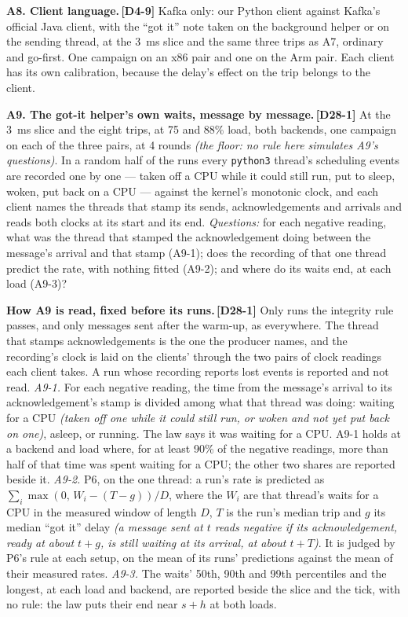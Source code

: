\documentclass[11pt]{article}
\newcommand{\gl}[1]{{\color{soft}\itshape\small (#1)}}
\newcommand{\chgold}[1]{\,{\color{oldcol}\bfseries\footnotesize[#1]}}
\begin{document}
\textbf{A8. Client language.}\chgold{D4-9} Kafka only: our Python client against Kafka's official Java client, with the ``got it'' note taken on the background helper or on the sending thread, at the 3~ms slice and the same three trips as A7, ordinary and go-first. One campaign on an x86 pair and one on the Arm pair. Each client has its own calibration, because the delay's effect on the trip belongs to the client.

\textbf{A9. The got-it helper's own waits, message by message.}\chgold{D28-1} At the 3~ms slice and the eight trips, at 75 and 88\% load, both backends, one campaign on each of the three pairs, at 4 rounds \gl{the floor: no rule here simulates A9's questions}. In a random half of the runs every \texttt{python3} thread's scheduling events are recorded one by one --- taken off a CPU while it could still run, put to sleep, woken, put back on a CPU --- against the kernel's monotonic clock, and each client names the threads that stamp its sends, acknowledgements and arrivals and reads both clocks at its start and its end. \emph{Questions:} for each negative reading, what was the thread that stamped the acknowledgement doing between the message's arrival and that stamp (A9-1); does the recording of that one thread predict the rate, with nothing fitted (A9-2); and where do its waits end, at each load (A9-3)?

\textbf{How A9 is read, fixed before its runs.}\chgold{D28-1} Only runs the integrity rule passes, and only messages sent after the warm-up, as everywhere. The thread that stamps acknowledgements is the one the producer names, and the recording's clock is laid on the clients' through the two pairs of clock readings each client takes. A run whose recording reports lost events is reported and not read. \emph{A9-1.} For each negative reading, the time from the message's arrival to its acknowledgement's stamp is divided among what that thread was doing: waiting for a CPU \gl{taken off one while it could still run, or woken and not yet put back on one}, asleep, or running. The law says it was waiting for a CPU. A9-1 holds at a backend and load where, for at least 90\% of the negative readings, more than half of that time was spent waiting for a CPU; the other two shares are reported beside it. \emph{A9-2.} P6, on the one thread: a run's rate is predicted as $\sum_i \max(0,\, W_i - (T - g))/D$, where the $W_i$ are that thread's waits for a CPU in the measured window of length $D$, $T$ is the run's median trip and $g$ its median ``got it'' delay \gl{a message sent at $t$ reads negative if its acknowledgement, ready at about $t + g$, is still waiting at its arrival, at about $t + T$}. It is judged by P6's rule at each setup, on the mean of its runs' predictions against the mean of their measured rates. \emph{A9-3.} The waits' 50th, 90th and 99th percentiles and the longest, at each load and backend, are reported beside the slice and the tick, with no rule: the law puts their end near $s + h$ at both loads.
\end{document}
